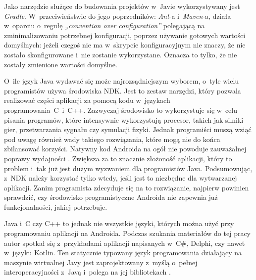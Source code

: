 Jako narzędzie służące do budowania projektów w~Javie wykorzystywany jest \textit{Gradle}. W~przeciwieństwie do jego poprzedników: \textit{Ant}-a i~\textit{Maven}-a, działa w~oparciu o~regułę \textit{„convention over configuration”} polegającą na zminimalizowaniu potrzebnej konfiguracji, poprzez używanie gotowych wartości domyślnych: jeżeli czegoś nie ma w~skrypcie konfiguracyjnym nie znaczy, że nie zostało skonfigurowane i~nie zostanie wykorzystane. Oznacza to tylko, że nie zostały zmienione wartości domyślne.

O~ile język Java wydawać się może najrozsądniejszym wyborem, o~tyle wielu programistów używa środowiska NDK. Jest to zestaw narzędzi, który pozwala realizować części aplikacji za pomocą kodu w~językach programowania~C~i~C++. Zazwyczaj środowisko to wykorzystuje się w~celu pisania programów, które intensywnie wykorzystują procesor, takich jak silniki gier, przetwarzania sygnału czy symulacji fizyki. Jednak programiści muszą wziąć pod uwagę również wady takiego rozwiązania, które mogą nie do końca zbilansować korzyści. Natywny kod Androida na ogół nie powoduje zauważalnej poprawy wydajności \cite{website:java:wydajnosc}. Zwiększa za to znacznie złożoność aplikacji, który to problem i~tak już jest dużym wyzwaniem dla programistów Java. Podsumowując, z~NDK należy korzystać tylko wtedy, jeśli jest to niezbędne dla wytwarzanej aplikacji. Zanim programista zdecyduje się na to rozwiązanie, najpierw powinien sprawdzić, czy środowisko programistyczne Androida nie zapewnia już funkcjonalności, jakiej potrzebuje.

Java i~C czy C++ to jednak nie wszystkie języki, których można użyć przy programowaniu aplikacji na Androida. Podczas szukania materiałów do tej pracy autor spotkał się z~przykładami aplikacji napisanych w~C\#, Delphi, czy nawet w~języku Kotlin. Ten statycznie typowany język programowania działający na maszynie wirtualnej Javy jest zaprojektowany z~myślą o~pełnej interoperacyjności z~Javą i~polega na jej bibliotekach \cite{website:wikipedia}. %


